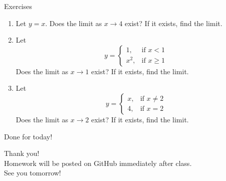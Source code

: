 \documentclass[]{beamer}
\begin{document}
    \begin{frame}{Exercises}
        \begin{enumerate}
            \item Let $y=x$. Does the limit as $x \to 4$ exist? If it exists, find the limit.
            \item Let 
                \begin{equation*}
                     y=\begin{cases}
                         1, & \text{if $x<1$}\\
                         x^2, & \text{if $x \geq 1$}
                     \end{cases}
                \end{equation*} 
                Does the limit as $x \to 1$ exist? If it exists, find the limit.
            \item Let
                \begin{equation*}
                    y=\begin{cases}
                        x, & \text{if $x\neq2$}\\
                        4, & \text{if $x = 2$}
                    \end{cases}
                \end{equation*} 
                Does the limit as $x \to 2$ exist? If it exists, find the limit.
        \end{enumerate}
    \end{frame}

    \begin{frame}{Done for today!}
        \begin{center}
            Thank you!\\ 
            Homework will be posted on GitHub immediately after class. \\
            See you tomorrow!\\
        \end{center}
    \end{frame}
\end{document}
